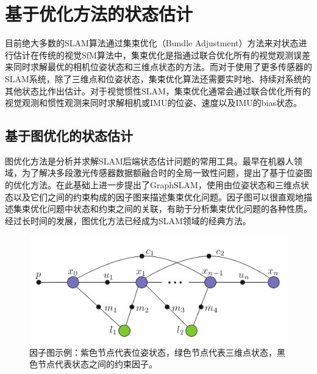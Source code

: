 \section{基于优化方法的状态估计}

目前绝大多数的SLAM算法通过集束优化\citep{triggs1999bundle}（Bundle Adjustment）方法来对状态进行估计在传统的视觉SfM算法中，集束优化是指通过联合优化所有的视觉观测误差来同时求解最优的相机位姿状态和三维点状态的方法。而对于使用了更多传感器的SLAM系统，除了三维点和位姿状态，集束优化算法还需要实时地、持续对系统的其他状态比作出估计。对于视觉惯性SLAM，集束优化通常会通过联合优化所有的视觉观测和惯性观测来同时求解相机或IMU的位姿、速度以及IMU的bias状态。

\subsection{基于图优化的状态估计}

图优化方法是分析并求解SLAM后端状态估计问题的常用工具。最早在机器人领域，为了解决多段激光传感器数据额融合时的全局一致性问题，\citep{lu1997globally,lu1997robot}提出了基于位姿图的优化方法。\citeauthor{thrun2006graph}在此基础上进一步提出了GraphSLAM\citep{thrun2006graph}，使用由位姿状态和三维点状态以及它们之间的约束构成的因子图来描述集束优化问题。因子图可以很直观地描述集束优化问题中状态和约束之间的关联，有助于分析集束优化问题的各种性质。经过长时间的发展，图优化方法已经成为SLAM领域的经典方法。

\begin{figure}[htb!]
    \centering
    \includegraphics[width=.8\textwidth]{figs/isam_factor_graph.png}
    \caption{因子图示例\citep{kaess2012isam2}：紫色节点代表位姿状态，绿色节点代表三维点状态，黑色节点代表状态之间的约束因子。}
    \label{fig:isam_factor_graph}
\end{figure}


